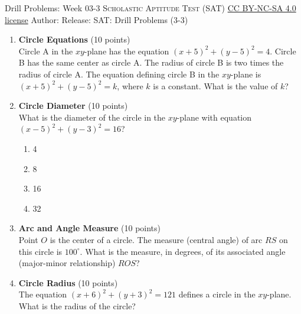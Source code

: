 \newpage\handout
{Drill Problems: Week 03-3}
{\textsc{Scholastic Aptitude Test (SAT)}}
{\href{https://creativecommons.org/licenses/by-nc-sa/4.0/}{CC BY-NC-SA 4.0 license}}
{Author: \BookAuthor}{Release: \generatedOn}
{SAT: Drill Problems (3-3)}


\begin{enumerate}
  \item \textbf{Circle Equations} (10 points)\\
  Circle A in the $xy$-plane has the equation $(x+5)^2+(y-5)^2=4$. Circle B has the same center as circle A. The radius of circle B is two times the radius of circle A. The equation defining circle B in the $xy$-plane is $(x+5)^2+(y-5)^2=k$, where $k$ is a constant. What is the value of $k$?
  \begin{subanswer}
  \end{subanswer}

  \item \textbf{Circle Diameter} (10 points)\\
  What is the diameter of the circle in the $xy$-plane with equation $(x-5)^2+(y-3)^2=16$?\\
  \begin{enumerate}[label=(\Alph*)]
    \item 4
    \item 8
    \item 16
    \item 32
  \end{enumerate}
  \begin{subanswer}
  \end{subanswer}

  \item \textbf{Arc and Angle Measure} (10 points)\\
  Point $O$ is the center of a circle. The measure (central angle) of arc $RS$ on this 
  circle is $100^{\circ}$. What is the measure, in degrees, of its associated angle (major-minor relationship) $ROS$?
  \begin{subanswer}
  \end{subanswer}

  \item \textbf{Circle Radius} (10 points)\\
  The equation $(x+6)^2+(y+3)^2=121$ defines a circle in the $xy$-plane. What is the radius of the circle?
  \begin{subanswer}
  \end{subanswer}


\end{enumerate}

